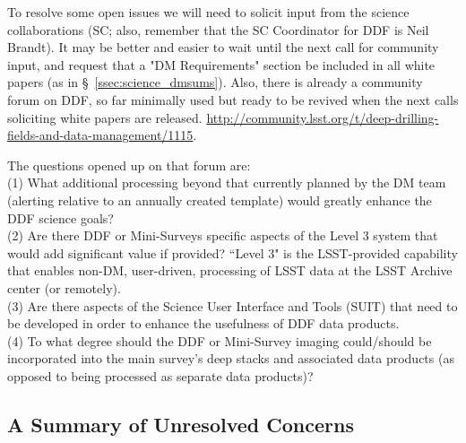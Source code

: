 \documentclass[DM,lsstdraft,toc]{lsstdoc}
\begin{document}
To resolve some open issues we will need to solicit input from the science collaborations (SC; also, remember that the SC Coordinator for DDF is Neil Brandt). It may be better and easier to wait until the next call for community input, and request that a "DM Requirements" section be included in all white papers (as in \S~\ref{ssec:science_dmsums}). Also, there is already a community forum on DDF, so far minimally used but ready to be revived when the next calls soliciting white papers are released. \url{http://community.lsst.org/t/deep-drilling-fields-and-data-management/1115}. 

\noindent The questions opened up on that forum are: \\
(1) What additional processing beyond that currently planned by the DM team (alerting relative to an annually created template) would greatly enhance the DDF science goals? \\
(2) Are there DDF or Mini-Surveys specific aspects of the Level 3 system that would add significant value if provided? ``Level 3" is the LSST-provided capability that enables non-DM, user-driven, processing of LSST data at the LSST Archive center (or remotely). \\
(3) Are there aspects of the Science User Interface and Tools (SUIT) that need to be developed in order to enhance the usefulness of DDF data products. \\
(4) To what degree should the DDF or Mini-Survey imaging could/should be incorporated into the main survey's deep stacks and associated data products (as opposed to being processed as separate data products)?


\clearpage
\subsection{A Summary of Unresolved Concerns} \label{ssec:intro_UC}
\end{document}
